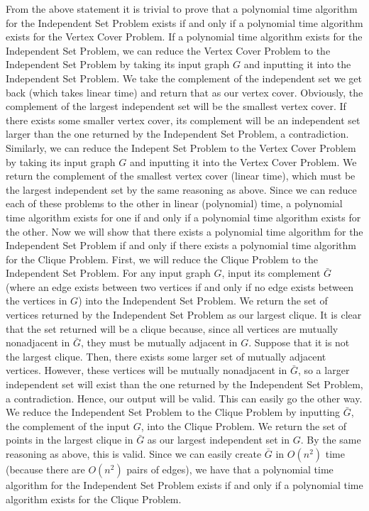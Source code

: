 \documentclass{article}
\begin{document}
\begin{enumerate}
\newline From the above statement it is trivial to prove that a polynomial time algorithm for the Independent Set Problem exists if and only if a polynomial time algorithm exists for the Vertex Cover Problem. If a polynomial time algorithm exists for the Independent Set Problem, we can reduce the Vertex Cover Problem to the Independent Set Problem by taking its input graph $G$ and inputting it into the Independent Set Problem. We take the complement of the independent set we get back (which takes linear time) and return that as our vertex cover.  Obviously, the complement of the largest independent set will be the smallest vertex cover. If there exists some smaller vertex cover, its complement will be an independent set larger than the one returned by the Independent Set Problem, a contradiction. Similarly, we can reduce the Indepent Set Problem to the Vertex Cover Problem by taking its input graph $G$ and inputting it into the Vertex Cover Problem. We return the complement of the smallest vertex cover (linear time), which must be the largest independent set by the same reasoning as above. Since we can reduce each of these problems to the other in linear (polynomial) time, a polynomial time algorithm exists for one if and only if a polynomial time algorithm exists for the other.
\newline
\newline Now we will show that there exists a polynomial time algorithm for the Independent Set Problem if and only if there exists a polynomial time algorithm for the Clique Problem. First, we will reduce the Clique Problem to the Independent Set Problem. For any input graph $G$, input its complement $\bar{G}$ (where an edge exists between two vertices if and only if no edge exists between the vertices in $G$) into the Independent Set Problem. We return the set of vertices returned by the Independent Set Problem as our largest clique. It is clear that the set returned will be a clique because, since all vertices are mutually nonadjacent in $\bar{G}$, they must be mutually adjacent in $G$. Suppose that it is not the largest clique. Then, there exists some larger set of mutually adjacent vertices. However, these vertices will be mutually nonadjacent in $\bar{G}$, so a larger independent set will exist than the one returned by the Independent Set Problem, a contradiction. Hence, our output will be valid. This can easily go the other way. We reduce the Independent Set Problem to the Clique Problem by inputting $\bar{G}$, the complement of the input $G$, into the Clique Problem. We return the set of points in the largest clique in $\bar{G}$ as our largest independent set in $G$. By the same reasoning as above, this is valid. Since we can easily create $\bar{G}$ in $O(n^2)$ time (because there are $O(n^2)$ pairs of edges), we have that a polynomial time algorithm for the Independent Set Problem exists if and only if a polynomial time algorithm exists for the Clique Problem.

\end{enumerate}
\end{document}
